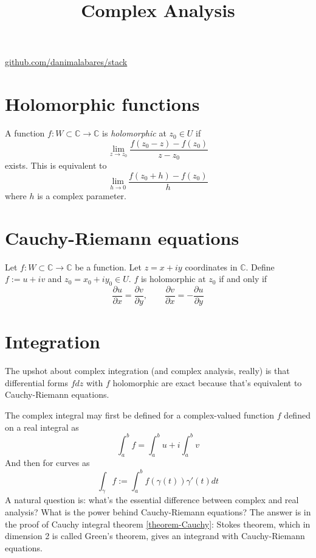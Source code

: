 



\title{Complex Analysis}
\maketitle

\label{section-phantom}
\hfill
\href{http://github.com/danimalabares/stack}{github.com/danimalabares/stack}

\tableofcontents

\section{Holomorphic functions}
\label{section-holomorphic-functions}

\begin{definition}
\label{definition-holomorphic-function}
A function $f:W\subset \mathbb{C} \to \mathbb{C}$ is {\it holomorphic} at $z_0
\in U$ if
$$
\lim_{z\to z_0} \frac{f(z_0-z)-f(z_0)}{z-z_0}
$$
exists. This is equivalent to
$$
\lim_{h\to 0} \frac{f(z_0+h)-f(z_0)}{h}
$$
where $h$ is a complex parameter.
\end{definition}

\section{Cauchy-Riemann equations}
\label{section-Cauchy-Riemann-equations}

\begin{theorem}
\label{theorem-Cauchy-Riemann}
Let $f:W\subset\mathbb{C}\to \mathbb{C}$ be a function. Let $z=x+iy$ coordinates
in $\mathbb{C}$. Define $f:=u+iv$ and
$z_0=x_0+iy_0 \in U$. $f$ is holomorphic at $z_0$ if and only if
$$
\frac{\partial u}{\partial x}=\frac{\partial v}{\partial y},\qquad \frac{\partial v}{\partial x}=-\frac{\partial u}{\partial y}
$$
\end{theorem}

\section{Integration}
\label{section-integration}

\noindent
The upshot about complex integration
(and complex analysis, really)
is that differential forms $fdz$ with $f$ holomorphic are exact
because that's equivalent to Cauchy-Riemann equations.

\medskip\noindent
The complex integral may first be defined for a complex-valued function $f$
defined on a real integral as
$$
\int_a^bf=\int_a^b u + i \int_a^bv
$$
And then for curves as
$$
\int_\gamma f:=\int_a^b f(\gamma(t))\gamma'(t)dt
$$
A natural question is: what's the essential difference between complex and real
analysis? What is the power behind Cauchy-Riemann equations? The answer is in
the proof of Cauchy integral theorem \ref{theorem-Cauchy}: Stokes theorem, which
in dimension 2 is called Green's theorem, gives an integrand with Cauchy-Riemann
equations.

